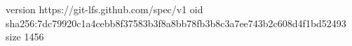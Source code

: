 version https://git-lfs.github.com/spec/v1
oid sha256:7dc79920c1a4cebb8f37583b3f8a8bb78fb3b8c3a7ee743b2c608d4f1bd52493
size 1456
